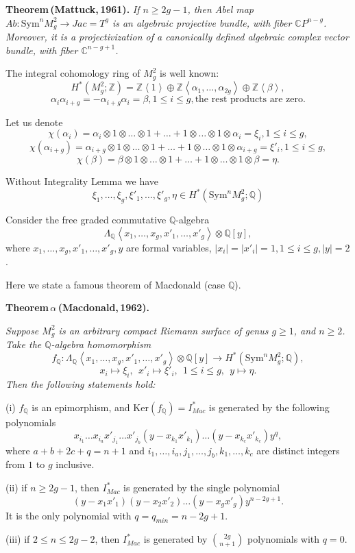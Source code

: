 \documentclass[a4paper,14pt]{article}
\newcommand{\Sym}{\mathrm{Sym}}
\newcommand{\Q}{\mathbb{Q}}
\newcommand{\Z}{\mathbb{Z}}
\begin{document}
{\bf Theorem\,(Mattuck,\,1961).} {\it If $n\ge 2g-1$, then Abel map $Ab:\Sym^n M^2_g \to Jac=T^g$ is an algebraic projective bundle, with fiber $\mathbb{C}P^{n-g}$. Moreover, it is a projectivization of a canonically defined algebraic complex vector bundle, with fiber $\mathbb{C}^{n-g+1}$.}

The integral cohomology ring of $M^2_g$ is well known:
$$
H^*(M^2_g;\Z)=\Z \left< 1\right>\oplus \Z\left< \alpha_1,\ldots,\alpha_{2g}\right>\oplus \Z \left< \beta \right>,
$$
$$
\alpha_i\alpha_{i+g}= - \alpha_{i+g}\alpha_i=\beta, 1\le i \le g, \text{the rest products are zero.} 
$$

Let us denote
$$
\chi(\alpha_i)=\alpha_i\otimes 1\otimes\ldots\otimes 1 +\ldots + 1\otimes\ldots\otimes 1\otimes\alpha_i= \xi_i, 1\le i\le g,
$$
$$
\chi(\alpha_{i+g})=\alpha_{i+g}\otimes 1\otimes\ldots\otimes 1 +\ldots + 1\otimes\ldots\otimes 1\otimes\alpha_{i+g}= \xi'_i, 1\le i\le g,
$$
$$
\chi(\beta)=\beta\otimes 1\otimes\ldots\otimes 1 +\ldots + 1\otimes\ldots\otimes 1\otimes\beta= \eta.
$$

Without Integrality Lemma we have
$$
\xi_1,\ldots,\xi_g,\xi'_1,\ldots,\xi'_g,\eta \in H^*(\Sym^n M^2_g;\Q)
$$

Consider the free graded commutative $\Q$-algebra
$$
\Lambda_{\Q} \left< x_1,\ldots,x_g,x'_1,\ldots,x'_g \right>\otimes \Q[y],
$$
where $x_1,\ldots,x_g,x'_1,\ldots,x'_g,y$ are formal variables, $|x_i|=|x'_i|=1, 1\le i\le g, |y|=2$. 

Here we state a famous theorem of Macdonald \cite{Mac1} (case $\Q$). 

{\bf Theorem\,$\alpha$\,(Macdonald,\,1962).} {\it Suppose $M^2_g$ is an arbitrary compact Riemann surface of genus $g\ge 1$, and $n\ge 2$. Take the $\Q$-algebra homomorphism
$$
f_{\Q}: \Lambda_{\Q} \left< x_1,\ldots,x_g,x'_1,\ldots,x'_g \right>\otimes \Q[y] \to H^*(\Sym^n M^2_g;\Q),
$$
$$
x_i \mapsto \xi_i, \ \  x'_i \mapsto \xi'_i, \ \ 1\le i\le g, \ \ y \mapsto \eta.
$$
Then the following statements hold: 

(i) $f_{\Q}$ is an epimorphism, and $\mathrm{Ker}(f_{\Q}) = I^*_{Mac}$ is generated by the following polynomials
$$
x_{i_1}\ldots x_{i_a}x'_{j_1}\ldots x'_{j_b} (y - x_{k_1}x'_{k_1})\ldots  (y - x_{k_c}x'_{k_c}) y^q,
$$
where $a+b+2c+ q=n+1$ and $i_1,\ldots,i_a,j_1,\ldots,j_b,k_1,\ldots,k_c$ are distinct integers from $1$ to $g$ inclusive.

(ii) if $n\ge 2g-1$, then $I^*_{Mac}$ is generated by the single polynomial
$$
(y - x_1x'_1)(y - x_2x'_2)\ldots (y - x_g x'_g) y^{n-2g+1}.
$$
It is the only polynomial with $q=q_{min}=n-2g+1$.

(iii) if $2\le n\le 2g-2$, then $I^*_{Mac}$ is generated by $\binom{2g}{n+1}$ polynomials with $q=0$.}
\end{document}
